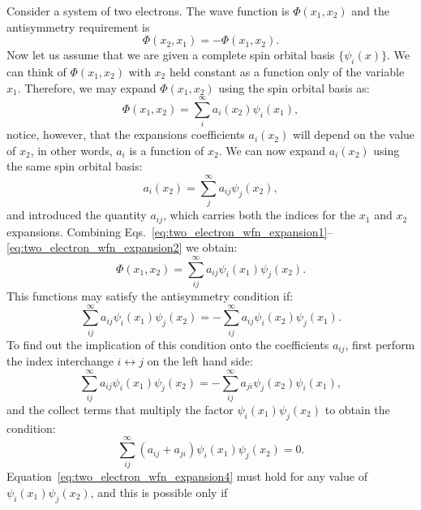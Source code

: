 \documentclass[../Main/chem532-notes.tex]{subfiles}
\begin{document}
\begin{example}
Consider a system of two electrons. The wave function is $\Phi(x_1,x_2)$ and the antisymmetry requirement is
\begin{equation}
 \Phi(x_2,x_1) = - \Phi(x_1,x_2).
\end{equation}
Now let us assume that we are given a complete spin orbital basis $\{ \psi_{i}(x) \}$.
We can think of $\Phi(x_1,x_2)$ with $x_2$ held constant as a function only of the variable $x_1$.
Therefore, we may expand $\Phi(x_1,x_2)$ using the spin orbital basis as:
\begin{equation}\label{eq:two_electron_wfn_expansion1}
\Phi(x_1,x_2) = \sum_{i}^{\infty} a_i(x_2) \psi_i(x_1),
\end{equation}
notice, however, that the expansions coefficients $a_i(x_2)$ will depend on the value of $x_2$, in other words, $a_i$ is a function of $x_2$.
We can now expand $a_i(x_2)$ using the same spin orbital basis:
\begin{equation}\label{eq:two_electron_wfn_expansion2}
a_i(x_2) = \sum_{j}^{\infty} a_{ij} \psi_j(x_2),
\end{equation}
and introduced the quantity $a_{ij}$, which carries both the indices for the $x_1$ and $x_2$ expansions.
Combining Eqs.~\eqref{eq:two_electron_wfn_expansion1}--\eqref{eq:two_electron_wfn_expansion2} we obtain:
\begin{equation}
\Phi(x_1,x_2) = \sum_{ij}^{\infty} a_{ij} \psi_i(x_1) \psi_j(x_2).
\end{equation}
This functions may satisfy the antisymmetry condition if:
\begin{equation}
\sum_{ij}^{\infty} a_{ij} \psi_i(x_1) \psi_j(x_2) = -\sum_{ij}^{\infty} a_{ij} \psi_i(x_2) \psi_j(x_1).
\end{equation}
To find out the implication of this condition onto the coefficients $a_{ij}$, first perform the index interchange $i \leftrightarrow j$ on the left hand side:
\begin{equation}
\sum_{ij}^{\infty} a_{ij} \psi_i(x_1) \psi_j(x_2) = -\sum_{ij}^{\infty} a_{ji} \psi_j(x_2) \psi_i(x_1),
\end{equation}
and the collect terms that multiply the factor $\psi_i(x_1) \psi_j(x_2)$ to obtain the condition:
\begin{equation}
\label{eq:two_electron_wfn_expansion4}
\sum_{ij}^{\infty} (a_{ij} + a_{ji}) \psi_i(x_1) \psi_j(x_2) = 0.
\end{equation}
Equation~\eqref{eq:two_electron_wfn_expansion4} must hold for any value of $\psi_i(x_1) \psi_j(x_2)$, and this is possible only if

\end{example}
\end{document}
